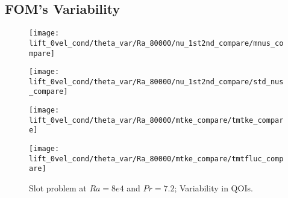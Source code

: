 \subsection{FOM's Variability}
\begin{figure}[h!]
    \begin{minipage}[b]{.25\linewidth}
   \centering 
   \texttt{[image: lift\_0vel\_cond/theta\_var/Ra\_80000/nu\_1st2nd\_compare/mnus\_compare]}
    \end{minipage}%
    \begin{minipage}[b]{.25\linewidth}
   \centering 
   \texttt{[image: lift\_0vel\_cond/theta\_var/Ra\_80000/nu\_1st2nd\_compare/std\_nus\_compare]}
    \end{minipage}%
    \begin{minipage}[b]{.25\linewidth}
   \centering 
   \texttt{[image: lift\_0vel\_cond/theta\_var/Ra\_80000/mtke\_compare/tmtke\_compare]}
    \end{minipage}%
    \begin{minipage}[b]{.25\linewidth}
   \centering 
   \texttt{[image: lift\_0vel\_cond/theta\_var/Ra\_80000/mtke\_compare/tmtfluc\_compare]}
    \end{minipage}%
   \caption{Slot problem at $Ra=8e4$ and $Pr=7.2$; Variability in QOIs.}
\label{fig:slot_pr_7.2_fom_mean} \end{figure}
